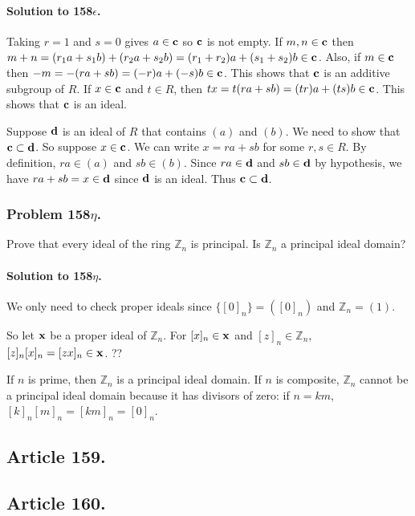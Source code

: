 \paragraph*{Solution to 158$\epsilon$.}
Taking $r = 1$ and $s = 0$ gives $a \in \mathsf{\mathbf{c}}$ so $\mathsf{\mathbf{c}}$ is not empty.
If $m, n \in \mathsf{\mathbf{c}}$ then $m + n = (r_1 a + s_1 b) + (r_2 a + s_2 b) = (r_1 +
r_2) a + (s_1 + s_2)b \in \mathsf{\mathbf{c}}$.  Also, if $ m \in \mathsf{\mathbf{c}} $ then $ -m =
-(ra + sb) = (-r)a + (-s)b \in \mathsf{\mathbf{c}}$. This shows that $\mathsf{\mathbf{c}}$ is an
additive subgroup of $R$. If $ x \in \mathsf{\mathbf{c}} $ and $ t \in R$, then $tx = t(ra
+ sb) = (tr)a + (ts)b \in \mathsf{\mathbf{c}}$. This shows that $\mathsf{\mathbf{c}}$ is an ideal.

Suppose $\mathsf{\mathbf{d}}$ is an ideal of $R$ that contains $(a)$ and $(b)$. We need to
show that $ \mathsf{\mathbf{c}} \subset \mathsf{\mathbf{d}}$. So suppose $ x \in \mathsf{\mathbf{c}}$. We can
write $x = ra + sb $ for some $r, s \in R$. By definition, $ ra \in (a) $ and $
sb \in (b) $. Since $ra \in \mathsf{\mathbf{d}}$ and $sb \in \mathsf{\mathbf{d}}$ by hypothesis, we
have $ra + sb = x \in \mathsf{\mathbf{d}}$ since $\mathsf{\mathbf{d}}$ is an ideal.  Thus $ \mathsf{\mathbf{c}}
\subset \mathsf{\mathbf{d}} $.

\subsubsection{Problem 158$\eta$.}
Prove that every ideal of the ring $\mathbb{Z}_n$ is principal. Is
$\mathbb{Z}_n$ a principal ideal domain?

\paragraph*{Solution to 158$\eta$.}
We only need to check proper ideals since $\{[0]_n\} = ([0]_n)$ and $\mathbb{Z}_n = (1)$.

So let $\mathsf{\mathbf{x}}$ be a proper ideal of $\mathbb{Z}_n$. For $ [x]_n \in \mathsf{\mathbf{x}}$ and
$ [z]_n \in \mathbb{Z}_n $, $ [z]_n [x]_n = [zx]_n \in \mathsf{\mathbf{x}}$. ??

If $n$ is prime, then $\mathbb{Z}_n$ is a principal ideal domain.  If $n$ is
composite, $\mathbb{Z}_n$ cannot be a principal ideal domain because it has
divisors of zero: if $n = km$, $[k]_n [m]_n = [km]_n = [0]_n$.

\subsection{Article 159.}

\subsection{Article 160.}


